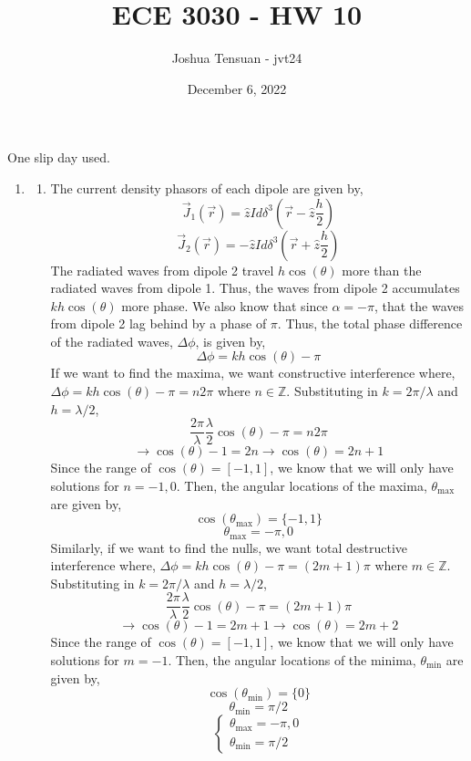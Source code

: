 \documentclass[12pt]{article}
\begin{document}
\usetikzlibrary{scopes}
\def\iangle{35} %

\def\down{-90}
\def\arcr{0.5cm} %

\title{ECE 3030 - HW 10}
\author{Joshua Tensuan - jvt24}
\date{December 6, 2022}
\maketitle

One slip day used.

\begin{enumerate}
	\item [10.1]
	\begin{enumerate}
		\item [(a)]
		The current density phasors of each dipole are given by,
		\[\vec J_1(\vec r)=\hat z Id\delta^3\left(\vec r-\hat z \frac{h}{2}\right)\]
		\[\vec J_2(\vec r)=-\hat z Id\delta^3\left(\vec r +\hat z\frac{h}{2}\right)\]
		The radiated waves from dipole 2 travel $h\cos(\theta)$ more than the radiated waves from dipole 1.
		Thus, the waves from dipole 2 accumulates $kh\cos(\theta)$ more phase.
		We also know that since $\alpha=-\pi$, that the waves from dipole 2 lag behind by a phase of $\pi$.
		Thus, the total phase difference of the radiated waves, $\Delta \phi$, is given by,
		\[\Delta\phi = kh\cos(\theta)-\pi\]
		If we want to find the maxima, we want constructive interference where, $\Delta\phi = kh\cos(\theta)-\pi = n2\pi$ where $n\in\mathbb{Z}$.
		Substituting in $k=2\pi/\lambda$ and $h=\lambda/2$,
		\[\frac{2\pi}{\lambda}\frac{\lambda}{2}\cos(\theta)-\pi =n 2\pi\]
		\[\to \cos(\theta)-1=2n\to \cos(\theta)=2n+1\]
		Since the range of $\cos(\theta)=[-1,1]$, we know that we will only have solutions for $n=-1,0$.
		Then, the angular locations of the maxima, $\theta_{\mathrm{max}}$ are given by,
		\[\cos(\theta_{\mathrm{max}})=\{-1,1\}\]
		\[\theta_{\mathrm{max}} = -\pi, 0\]
		Similarly, if we want to find the nulls, we want total destructive interference where, $\Delta\phi = kh\cos(\theta)-\pi = (2m+1)\pi$ where $m\in\mathbb{Z}$.
		Substituting in $k=2\pi/\lambda$ and $h=\lambda/2$,
		\[\frac{2\pi}{\lambda}\frac{\lambda}{2}\cos(\theta)-\pi=(2m+1)\pi\]
		\[\to \cos(\theta)-1 = 2m+1\to \cos(\theta)=2m+2\]
		Since the range of $\cos(\theta)=[-1,1]$, we know that we will only have solutions for $m=-1$.
		Then, the angular locations of the minima, $\theta_{\mathrm{min}}$ are given by,
		\[\cos(\theta_{\mathrm{min}})=\{0\}\]
		\[\theta_{\mathrm{min}} = \pi/2\]
		\[\boxed{\begin{cases}
			\theta_{\mathrm{max}} = -\pi, 0 \\ 
			\theta_{\mathrm{min}} = \pi/2	
		\end{cases}}\]


\end{enumerate}
\end{enumerate}
\end{document}
